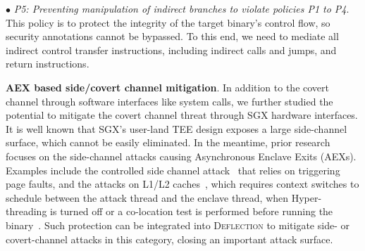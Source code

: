 
\vspace{2pt}\noindent$\bullet$\textit{ P5: Preventing manipulation of indirect branches to violate policies P1 to P4}. This policy is to protect the integrity of the target binary's control flow, so security annotations cannot be bypassed. To this end, we need to mediate all indirect control transfer instructions, including indirect calls and jumps, and return instructions.



\vspace{3pt}\noindent\textbf{AEX based side/covert channel mitigation}. 
In addition to the covert channel through software interfaces like system calls, we further studied the potential to mitigate the covert channel threat through SGX hardware interfaces.
It is well known that SGX's user-land TEE design exposes a large side-channel surface, which cannot be easily eliminated. In the meantime, prior research focuses on the side-channel attacks causing Asynchronous Enclave Exits (AEXs). Examples include the controlled side channel attack~\cite{xu2015controlled} that relies on triggering page faults, and the attacks on L1/L2 caches~\cite{wang2017leaky}, which requires context switches to schedule between the attack thread and the enclave thread, when Hyper-threading is turned off or a co-location test is performed before running the binary~\cite{chen2018racing}. Such protection can be integrated into \textsc{Deflection} to mitigate \DIFdelbegin {}\DIFdelend side- or covert-channel attacks in this category, closing an important attack surface.


